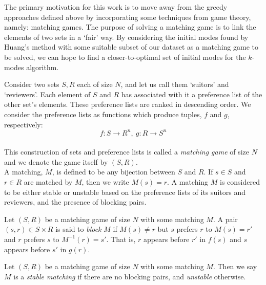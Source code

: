 The primary motivation for this work is to move away from the greedy approaches
defined above by incorporating some techniques from game theory, namely:
matching games. The purpose of solving a matching game is to link the elements
of two sets in a `fair' way. By considering the initial modes found by Huang's 
method with some suitable subset of our dataset as a matching game to be solved, 
we can hope to find a closer-to-optimal set of initial modes for the \(k\)-modes 
algorithm.


\begin{definition}\label{def:matching-game}
    Consider two sets \(S, R\) each of size \(N\), and let us call them 
    `suitors' and `reviewers'. Each element of \(S\) and \(R\) has associated 
    with it a preference list of the other set's elements. These preference 
    lists are ranked in descending order. We consider the preference lists as 
    functions which produce tuples, \(f\) and \(g\), respectively:
	\[
	    f : S \to R^n, \ g : R \to S^n
	\]\\

	This construction of sets and preference lists is called a 
    \emph{matching game} of size \(N\) and we denote the game itself by 
    \((S,R)\).\\
	
    A matching, \(M\), is defined to be any bijection between \(S\) and \(R\). 
    If \(s \in S\) and \(r \in R\) are matched by \(M\), then we write \(M(s) = 
    r\). A matching \(M\) is considered to be either stable or unstable based on
    the preference lists of its suitors and reviewers, and the presence of 
    blocking pairs.
\end{definition}

\begin{definition}\label{def:blocking-pair}
    Let \((S, R)\) be a matching game of size \(N\) with some matching \(M\). A 
    pair \((s, r) \in S \times R\) is said to \emph{block} \(M\) if \(M(s) \ne
    r\) but \(s\) prefers \(r\) to \(M(s) = r'\) and \(r\) prefers \(s\) to
    \(M^{-1}(r) = s'\). That is, \(r\) appears before \(r'\) in \(f(s)\) and
    \(s\) appears before \(s'\) in \(g(r)\).
\end{definition}

\begin{definition}\label{def:stable-matching}
    Let \((S, R)\) be a matching game of size \(N\) with some matching \(M\). 
    Then we say \(M\) is a \emph{stable matching} if there are no blocking 
    pairs, and \emph{unstable} otherwise.
\end{definition}

